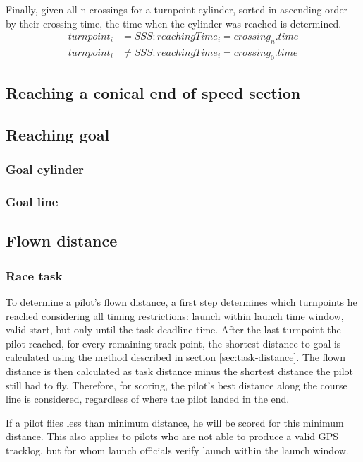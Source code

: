 \documentclass{article}
\begin{document}
Finally, given all n crossings for a turnpoint cylinder, sorted in ascending
order by their crossing time, the time when the cylinder was reached is
determined.
\begin{align*}
    turnpoint_i &= SSS : reachingTime_i = crossing_n . time \\
    turnpoint_i &\neq SSS : reachingTime_i = crossing_0 . time
\end{align*}
\subsection{Reaching a conical end of speed section}
\subsection{Reaching goal}
\subsubsection{Goal cylinder}
\subsubsection{Goal line}

\subsection{Flown distance}

\subsubsection{Race task}
\label{sec:race-task}
To determine a pilot’s flown distance, a first step determines which turnpoints
he reached considering all timing restrictions: launch within launch time
window, valid start, but only until the task deadline time. After the last
turnpoint the pilot reached, for every remaining track point, the shortest
distance to goal is calculated using the method described in section
\ref{sec:task-distance}. The flown distance is then calculated as task distance
minus the shortest distance the pilot still had to fly. Therefore, for scoring,
the pilot’s best distance along the course line is considered, regardless of
where the pilot landed in the end.

If a pilot flies less than minimum distance, he will be scored for this minimum
distance. This also applies to pilots who are not able to produce a valid GPS
tracklog, but for whom launch officials verify launch within the launch window.
\end{document}
